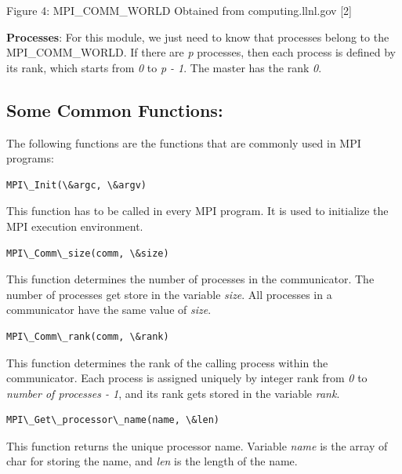 \documentclass[letterpaper,10pt,openany,oneside]{sphinxmanual}
\begin{document}
\begin{center}Figure 4: MPI\_COMM\_WORLD Obtained from computing.llnl.gov {[}2{]}
\end{center}
\textbf{Processes}: For this module, we just need to know that processes belong to the MPI\_COMM\_WORLD. If there are \emph{p} processes, then each process is defined by its rank, which starts from \emph{0} to \emph{p - 1}. The master has the rank \emph{0}.


\subsection{Some Common Functions:}
\label{introMPI/introMPI:some-common-functions}
The following functions are the functions that are commonly used in MPI programs:

\begin{Verbatim}[commandchars=\\\{\}]
MPI\_Init(\&argc, \&argv)
\end{Verbatim}

This function has to be called in every MPI program. It is used to initialize the MPI execution environment.

\begin{Verbatim}[commandchars=\\\{\}]
MPI\_Comm\_size(comm, \&size)
\end{Verbatim}

This function determines the number of processes in the communicator. The number of processes get store in the variable \emph{size}. All processes in a communicator have the same value of \emph{size}.

\begin{Verbatim}[commandchars=\\\{\}]
MPI\_Comm\_rank(comm, \&rank)
\end{Verbatim}

This function determines the rank of the calling process within the communicator. Each process is assigned uniquely by integer rank from \emph{0} to \emph{number of processes - 1}, and its rank gets stored in the variable \emph{rank}.

\begin{Verbatim}[commandchars=\\\{\}]
MPI\_Get\_processor\_name(name, \&len)
\end{Verbatim}

This function returns the unique processor name. Variable \emph{name} is the array of char for storing the name, and \emph{len} is the length of the name.
\end{document}
